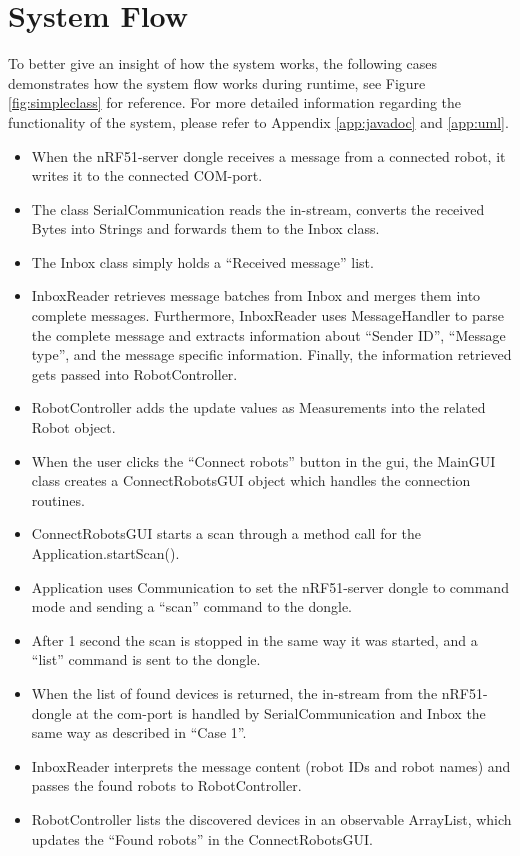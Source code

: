 \section{System Flow}
\label{secr:systemflow}
To better give an insight of how the system works, the following cases demonstrates how the system flow works during runtime, see Figure \ref{fig:simpleclass} for reference. For more detailed information regarding the functionality of the system, please refer to Appendix \ref{app:javadoc} and \ref{app:uml}.

\begin{itemize}
    \item When the nRF51-server dongle receives a message from a connected robot, it writes it to the connected COM-port.
    \item The class SerialCommunication reads the in-stream, converts the received Bytes into Strings and forwards them to the Inbox class.
    \item The Inbox class simply holds a ``Received message'' list.
    \item InboxReader retrieves message batches from Inbox and merges them into complete messages. Furthermore, InboxReader uses MessageHandler to parse the complete message and extracts information about ``Sender ID'', ``Message type'', and the message specific information. Finally, the information retrieved gets passed into RobotController.
    \item RobotController adds the update values as Measurements into the related Robot object.
\end{itemize}

\begin{itemize}
    \item When the user clicks the ``Connect robots'' button in the \acrshort{gui}, the MainGUI class creates a ConnectRobotsGUI object which handles the connection routines.
    \item ConnectRobotsGUI starts a scan through a method call for the Application.startScan().
    \item Application uses Communication to set the nRF51-server dongle to command mode and sending a ``scan'' command to the dongle.
    \item After 1 second the scan is stopped in the same way it was started, and a ``list'' command is sent to the dongle.
    \item When the list of found devices is returned, the in-stream from the nRF51-dongle at the \acrshort{com}-port is handled by SerialCommunication and Inbox the same way as described in ``Case 1''.
    \item InboxReader interprets the message content (robot IDs and robot names) and passes the found robots to RobotController.
    \item RobotController lists the discovered devices in an observable ArrayList, which updates the ``Found robots'' in the ConnectRobotsGUI.
\end{itemize}

